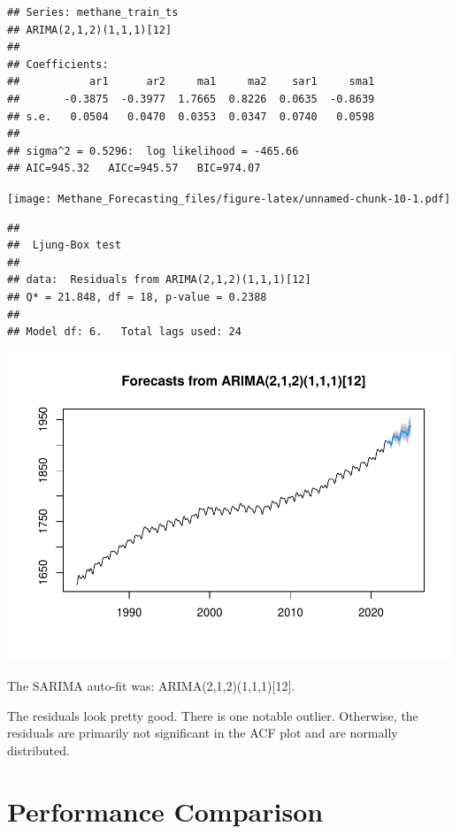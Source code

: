 \documentclass[
]{article}
\begin{document}
\begin{verbatim}
## Series: methane_train_ts 
## ARIMA(2,1,2)(1,1,1)[12] 
## 
## Coefficients:
##           ar1      ar2     ma1     ma2    sar1     sma1
##       -0.3875  -0.3977  1.7665  0.8226  0.0635  -0.8639
## s.e.   0.0504   0.0470  0.0353  0.0347  0.0740   0.0598
## 
## sigma^2 = 0.5296:  log likelihood = -465.66
## AIC=945.32   AICc=945.57   BIC=974.07
\end{verbatim}

\texttt{[image: Methane\_Forecasting\_files/figure-latex/unnamed-chunk-10-1.pdf]}

\begin{verbatim}
## 
##  Ljung-Box test
## 
## data:  Residuals from ARIMA(2,1,2)(1,1,1)[12]
## Q* = 21.848, df = 18, p-value = 0.2388
## 
## Model df: 6.   Total lags used: 24
\end{verbatim}

\includegraphics{Methane_Forecasting_files/figure-latex/unnamed-chunk-10-2.pdf}

The SARIMA auto-fit was: ARIMA(2,1,2)(1,1,1){[}12{]}.

The residuals look pretty good. There is one notable outlier. Otherwise,
the residuals are primarily not significant in the ACF plot and are
normally distributed.

\section{Performance Comparison}\label{performance-comparison}
\end{document}
